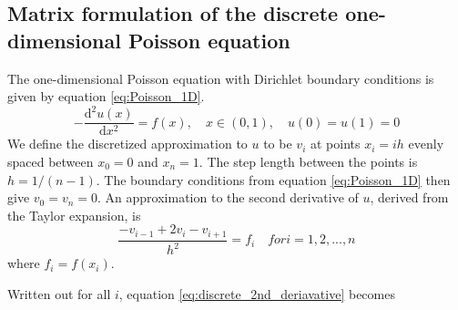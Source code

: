 \documentclass[reprint, english,notitlepage]{revtex4-1}  %
\begin{document}
\subsection{Matrix formulation of the discrete one-dimensional Poisson equation}
The one-dimensional Poisson equation with Dirichlet boundary conditions is given by equation \ref{eq:Poisson_1D}.
\begin{equation}
  \label{eq:Poisson_1D}
  - \frac{\mathrm d^2 u(x)}{\mathrm d x^2} = f(x), \quad x \in (0, 1), \quad u(0) = u(1) = 0
\end{equation}
We define the discretized approximation to $u$ to be $v_i$ at points $x_i = i h$ evenly spaced between $x_0 = 0$ and $x_n = 1$. The step length between the points is $h = 1/(n - 1)$. The boundary conditions from equation \ref{eq:Poisson_1D} then give $v_0 = v_n = 0$. An approximation to the second derivative of $u$, derived from the Taylor expansion, is
\begin{equation}
  \label{eq:discrete_2nd_deriavative}
  \frac{-v_{i-1} + 2 v_i - v_{i+1}}{h^2} = f_i \quad for i = 1, 2, ..., n
\end{equation}
where $f_i = f(x_i)$.

Written out for all $i$, equation \ref{eq:discrete_2nd_deriavative} becomes
\end{document}
